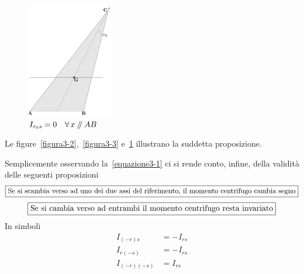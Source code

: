 \renewcommand{\thefigure}{3~-~4}
\begin{figure}[h!]
\centering
\includegraphics[width=0.34\textwidth]{Immagini/Parte_3/Figura3_4/Figura3_4.pdf}
\caption{$I_{r_{0}s} = 0 \quad \forall\,x\,\mathbin{\!/\mkern-5mu/\!}\,AB$}
\label{figura3-4}
\end{figure}

\noindent Le figure~\ref{figura3-2},~\ref{figura3-3} e~\ref{figura3-4} illustrano la suddetta proposizione.

\noindent Semplicemente osservando la~\eqref{equazione3-1} ci si rende conto, infine, della validità delle seguenti proposizioni
\begin{equation*}
\boxed{\textup{\small Se si scambia verso ad uno dei due assi del riferimento, il momento centrifugo cambia segno}}
\end{equation*}
\begin{equation*}
\boxed{\textup{Se si cambia verso ad entrambi il momento centrifugo resta invariato}}
\end{equation*}
In simboli
\begin{align}
I_{(-r)s}    &= -I_{rs} \tag{3.3a} \label{equazione3-3a} \\ 
I_{r(-s)}    &= -I_{rs} \tag{3.3b} \label{equazione3-3b}\\ 
I_{(-r)(-s)} &= I_{rs} \tag{3.3c} \label{equazione3-3c}
\end{align}
